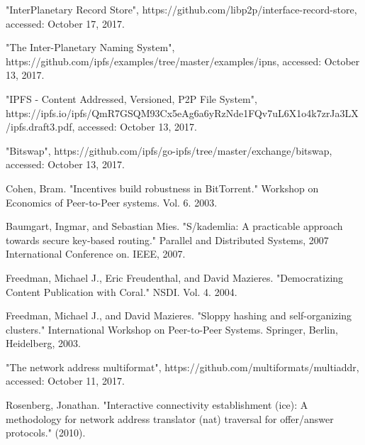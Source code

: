 \documentclass[conference]{IEEEtran}
\begin{document}
%
%
%
\begin{thebibliography}{1}

 "InterPlanetary Record Store", https://github.com/libp2p/interface-record-store, accessed: October 17, 2017.

 "The Inter-Planetary Naming System", https://github.com/ipfs/examples/tree/master/examples/ipns, accessed: October 13, 2017.

 "IPFS - Content Addressed, Versioned, P2P File System", https://ipfs.io/ipfs/QmR7GSQM93Cx5eAg6a6yRzNde1FQv7uL6X1o4k7zrJa3LX/ipfs.draft3.pdf, accessed: October 13, 2017.

 "Bitswap", https://github.com/ipfs/go-ipfs/tree/master/exchange/bitswap, accessed: October 13, 2017.

 Cohen, Bram. "Incentives build robustness in BitTorrent." Workshop on Economics of Peer-to-Peer systems. Vol. 6. 2003.

 Baumgart, Ingmar, and Sebastian Mies. "S/kademlia: A practicable approach towards secure key-based routing." Parallel and Distributed Systems, 2007 International Conference on. IEEE, 2007.

 Freedman, Michael J., Eric Freudenthal, and David Mazieres. "Democratizing Content Publication with Coral." NSDI. Vol. 4. 2004.

 Freedman, Michael J., and David Mazieres. "Sloppy hashing and self-organizing clusters." International Workshop on Peer-to-Peer Systems. Springer, Berlin, Heidelberg, 2003.

 "The network address multiformat", https://github.com/multiformats/multiaddr, accessed: October 11, 2017.

 Rosenberg, Jonathan. "Interactive connectivity establishment (ice): A methodology for network address translator (nat) traversal for offer/answer protocols." (2010).


\end{thebibliography}
\end{document}
